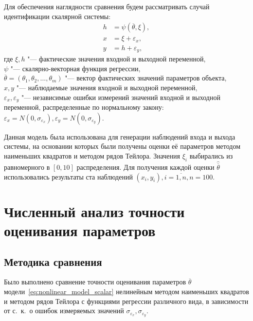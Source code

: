 Для обеспечения наглядности сравнения будем рассматривать случай
идентификации скалярной системы:
\begin{equation}
  \label{eq:nonlinear_model_scalar}
  \begin{aligned}
    h &= \psi(\overline{\theta}, \xi), \\
    x &= \xi + \varepsilon_x, \\
    y &= h + \varepsilon_y,
  \end{aligned}
\end{equation}
где \( \xi, h \) "--- фактические значения входной и выходной переменной, \\
\hspace*{7mm} \( \psi \) "--- скалярно-векторная функция регрессии, \\
\hspace*{7mm} \( \overline{\theta} = (\theta_1, \theta_2, \dotsc, \theta_m) \)
"--- вектор фактических значений параметров объекта, \\
\hspace*{7mm} \( x, y \) "--- наблюдаемые значения входной и выходной переменной, \\
\hspace*{6mm} \( \varepsilon_x, \varepsilon_y \)
"--- независимые ошибки измерений значений входной и выходной переменной,
распределенные по нормальному закону:
\(
\varepsilon_x = N(0, \sigma_{\varepsilon_x}),
\varepsilon_y = N(0, \sigma_{\varepsilon_y})
\).

Данная модель была использована для генерации наблюдений входа и выхода системы,
на основании которых были получены оценки её параметров
методом наименьших квадратов и методом рядов Тейлора.
Значения \( \xi_i \) выбирались из равномерного в \( [0, 10] \) распределения.
Для получения каждой оценки \( \hat{\overline{\theta}} \) использовались результаты
ста наблюдений \( ( x_i, y_i ), i = \overline{1, n}, n = 100 \).

\section{Численный анализ точности оценивания параметров}

\subsection{Методика сравнения}\label{subsec:nonlinear_comparison_conditions}

Было выполнено сравнение точности оценивания параметров \( \overline{\theta} \)
модели~\eqref{eq:nonlinear_model_scalar}
нелинейным методом наименьших квадратов и методом рядов Тейлора
с функциями регрессии различного вида,
в зависимости от с.~к.~о ошибок измеряемых значений
\( \sigma_{\varepsilon_x}, \sigma_{\varepsilon_y} \).

